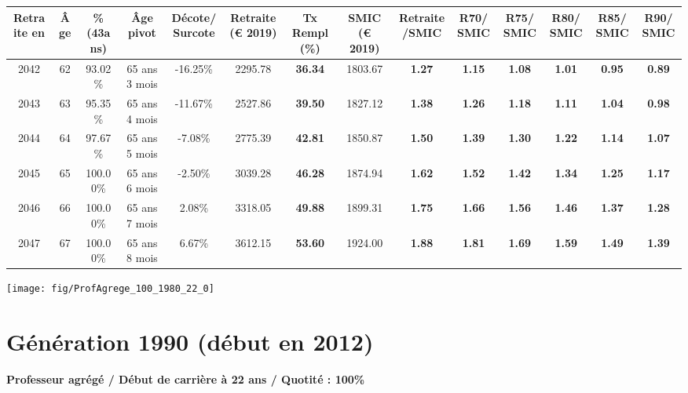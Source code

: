 \begin{adjustbox}{max width=\textwidth} 
\begin{tabular}[htb]{|c|c||c|c|c||c|c||c|c||c|c|c|c|c|} 
\hline 
 Retraite en &  Âge &  \%(43ans) &  Âge pivot &  Décote/Surcote &  Retraite (\euro{} 2019) &  Tx Rempl(\%) &  SMIC (\euro{} 2019) &  Retraite/SMIC &  R70/SMIC &  R75/SMIC &  R80/SMIC &  R85/SMIC &  R90/SMIC \\ 
\hline \hline 
 2042 &  62 &  93.02\% &  65 ans 3 mois &  -16.25\% &  2295.78 &  {\bf 36.34} &  1803.67 &  {\bf 1.27} &  {\bf 1.15} &  {\bf 1.08} &  {\bf 1.01} &  {\bf {\color{red} 0.95}} &  {\bf {\color{red} 0.89}} \\ 
\hline 
 2043 &  63 &  95.35\% &  65 ans 4 mois &  -11.67\% &  2527.86 &  {\bf 39.50} &  1827.12 &  {\bf 1.38} &  {\bf 1.26} &  {\bf 1.18} &  {\bf 1.11} &  {\bf 1.04} &  {\bf {\color{red} 0.98}} \\ 
\hline 
 2044 &  64 &  97.67\% &  65 ans 5 mois &  -7.08\% &  2775.39 &  {\bf 42.81} &  1850.87 &  {\bf 1.50} &  {\bf 1.39} &  {\bf 1.30} &  {\bf 1.22} &  {\bf 1.14} &  {\bf 1.07} \\ 
\hline 
 2045 &  65 &  100.00\% &  65 ans 6 mois &  -2.50\% &  3039.28 &  {\bf 46.28} &  1874.94 &  {\bf 1.62} &  {\bf 1.52} &  {\bf 1.42} &  {\bf 1.34} &  {\bf 1.25} &  {\bf 1.17} \\ 
\hline 
 2046 &  66 &  100.00\% &  65 ans 7 mois &  2.08\% &  3318.05 &  {\bf 49.88} &  1899.31 &  {\bf 1.75} &  {\bf 1.66} &  {\bf 1.56} &  {\bf 1.46} &  {\bf 1.37} &  {\bf 1.28} \\ 
\hline 
 2047 &  67 &  100.00\% &  65 ans 8 mois &  6.67\% &  3612.15 &  {\bf 53.60} &  1924.00 &  {\bf 1.88} &  {\bf 1.81} &  {\bf 1.69} &  {\bf 1.59} &  {\bf 1.49} &  {\bf 1.39} \\ 
\hline 
\hline 
\end{tabular} 
\end{adjustbox} 
 
 \vspace{0.1cm} 

 {\hspace{-2.2cm}\texttt{[image: fig/ProfAgrege\_100\_1980\_22\_0]}} 

\newpage 
 
\section{Génération 1990 (début en 2012)\label{ProfAgrege_100_1990_22_0}} 
 
{\bf \noindent Professeur agrégé / Début de carrière à 22 ans / Quotité : 100\%}  ~ 

